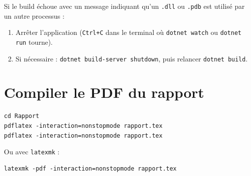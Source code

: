 Si le build échoue avec un message indiquant qu'un \texttt{.dll} ou \texttt{.pdb} est utilisé par un autre processus :

\begin{enumerate}[leftmargin=*]
  \item Arrêter l'application (\texttt{Ctrl+C} dans le terminal où \texttt{dotnet watch} ou \texttt{dotnet run} tourne).
  \item Si nécessaire : \texttt{dotnet build-server shutdown}, puis relancer \texttt{dotnet build}.
\end{enumerate}

\section{Compiler le PDF du rapport}

\begin{verbatim}
cd Rapport
pdflatex -interaction=nonstopmode rapport.tex
pdflatex -interaction=nonstopmode rapport.tex
\end{verbatim}

Ou avec \texttt{latexmk} :

\begin{verbatim}
latexmk -pdf -interaction=nonstopmode rapport.tex
\end{verbatim}
